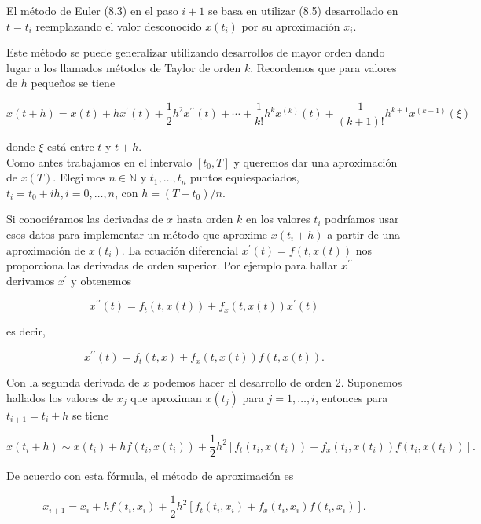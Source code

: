 \documentclass[10pt]{book}
\begin{document}
El método de Euler (8.3) en el paso $i+1$ se basa en utilizar (8.5) desarrollado en $t=t_{i}$ reemplazando el valor desconocido $x\left(t_{i}\right)$ por su aproximación $x_{i}$.

Este método se puede generalizar utilizando desarrollos de mayor orden dando lugar a los llamados métodos de Taylor de orden $k$. Recordemos que para valores de $h$ pequeños se tiene


\begin{equation*}
x(t+h)=x(t)+h x^{\prime}(t)+\frac{1}{2} h^{2} x^{\prime \prime}(t)+\cdots+\frac{1}{k!} h^{k} x^{(k)}(t)+\frac{1}{(k+1)!} h^{k+1} x^{(k+1)}(\xi) \tag{8.6}
\end{equation*}


donde $\xi$ está entre $t$ y $t+h$.\\
Como antes trabajamos en el intervalo $\left[t_{0}, T\right]$ y queremos dar una aproximación de $x(T)$. Elegi$\operatorname{mos} n \in \mathbb{N}$ y $t_{1}, \ldots, t_{n}$ puntos equiespaciados, $t_{i}=t_{0}+i h, i=0, \ldots, n$, con $h=\left(T-t_{0}\right) / n$.

Si conociéramos las derivadas de $x$ hasta orden $k$ en los valores $t_{i}$ podríamos usar esos datos para implementar un método que aproxime $x\left(t_{i}+h\right)$ a partir de una aproximación de $x\left(t_{i}\right)$. La ecuación diferencial $x^{\prime}(t)=f(t, x(t))$ nos proporciona las derivadas de orden superior. Por ejemplo para hallar $x^{\prime \prime}$ derivamos $x^{\prime}$ y obtenemos

$$
x^{\prime \prime}(t)=f_{t}(t, x(t))+f_{x}(t, x(t)) x^{\prime}(t)
$$

es decir,

$$
x^{\prime \prime}(t)=f_{t}(t, x)+f_{x}(t, x(t)) f(t, x(t)) .
$$

Con la segunda derivada de $x$ podemos hacer el desarrollo de orden 2. Suponemos hallados los valores de $x_{j}$ que aproximan $x\left(t_{j}\right)$ para $j=1, \ldots, i$, entonces para $t_{i+1}=t_{i}+h$ se tiene

$$
x\left(t_{i}+h\right) \sim x\left(t_{i}\right)+h f\left(t_{i}, x\left(t_{i}\right)\right)+\frac{1}{2} h^{2}\left[f_{t}\left(t_{i}, x\left(t_{i}\right)\right)+f_{x}\left(t_{i}, x\left(t_{i}\right)\right) f\left(t_{i}, x\left(t_{i}\right)\right)\right] .
$$

De acuerdo con esta fórmula, el método de aproximación es


\begin{equation*}
x_{i+1}=x_{i}+h f\left(t_{i}, x_{i}\right)+\frac{1}{2} h^{2}\left[f_{t}\left(t_{i}, x_{i}\right)+f_{x}\left(t_{i}, x_{i}\right) f\left(t_{i}, x_{i}\right)\right] . \tag{8.7}
\end{equation*}
\end{document}
